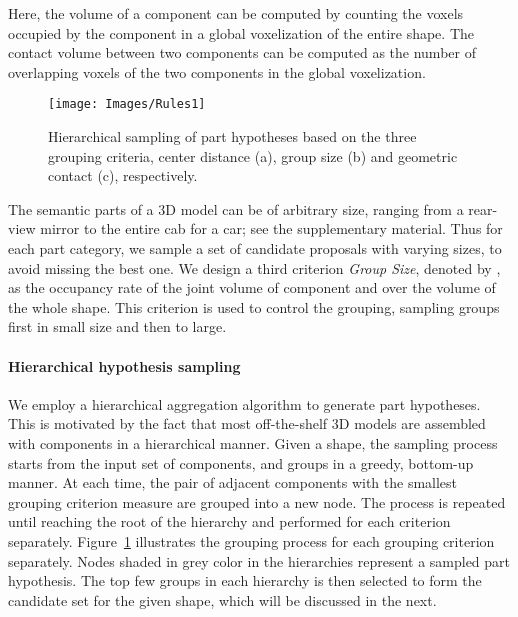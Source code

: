 \documentclass[acmtog]{acmart}
\begin{document}
Here, the volume of a component can be computed by counting the voxels occupied by the component
in a global voxelization of the entire shape.
The contact volume between two components can be computed as the number of overlapping voxels of the two
components in the global voxelization.


\begin{figure}[t]
  \centering
  \texttt{[image: Images/Rules1]}
  \caption{Hierarchical sampling of part hypotheses based on the three grouping criteria,
  center distance (a), group size (b) and geometric contact (c), respectively.}
  \label{fig:Rules}
\end{figure}


The semantic parts of a 3D model can be of arbitrary size,
ranging from a rear-view mirror to the entire cab for a car;
see the supplementary material.
Thus for each part category, we sample a set of candidate proposals with varying sizes, to avoid
missing the best one.
We design a third criterion \emph{Group Size}, denoted by ,
as the occupancy rate of the joint volume of component  and  over the volume of the whole shape.
This criterion is used to control the grouping, sampling groups first in small size and then to large.


\paragraph{\textbf{Hierarchical hypothesis sampling}}
We employ a hierarchical aggregation algorithm to generate part hypotheses.
This is motivated by the fact that most off-the-shelf 3D models
are assembled with components in a hierarchical manner.
Given a shape, the sampling process starts from the input set of components, and
groups in a greedy, bottom-up manner.
At each time, the pair of adjacent components with the smallest grouping criterion measure are
grouped into a new node.
The process is repeated until reaching the root of the hierarchy and performed for each criterion separately.
Figure~\ref{fig:Rules} illustrates the grouping process for each grouping criterion separately.
Nodes shaded in grey color in the hierarchies represent a sampled part hypothesis.
The top few groups in each hierarchy is then selected to form the candidate set for the given shape,
which will be discussed in the next.
\end{document}
